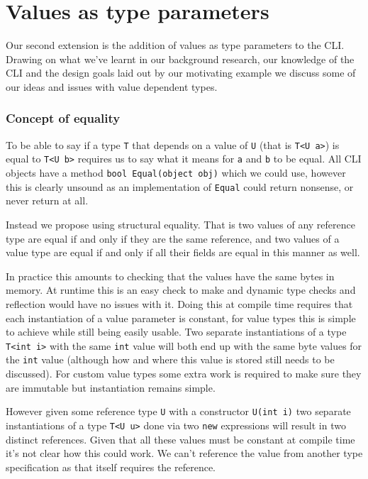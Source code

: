 \chapter{Values as type parameters}

Our second extension is the addition of values as type parameters to the CLI.
Drawing on what we've learnt in our background research, our knowledge of the 
CLI and the design goals laid out by our motivating example we discuss some of
our ideas and issues with value dependent types.

\subsection{Concept of equality}

To be able to say if a type \texttt{T} that depends on a value of
\texttt{U} (that is \texttt{T<U a>}) is equal to \texttt{T<U b>} requires
us to say what it means for \texttt{a} and \texttt{b} to be equal.
All CLI objects have a method \texttt{bool Equal(object obj)} which
we could use, however this is clearly unsound as an implementation
of \texttt{Equal} could return nonsense, or never return at all.

Instead we propose using structural equality. That is
two values of any reference type are equal if and only if they are
the same reference, and two values of a value type are equal if and
only if all their fields are equal in this manner as well. 

In practice this amounts to checking that the values have the same bytes in memory.
At runtime this is an easy check to make and dynamic type checks and reflection would have
no issues with it. Doing this at compile time requires that each instantiation of a value 
parameter is constant, for value types this is simple to achieve while still being easily usable.
Two separate instantiations of a type \texttt{T<int i>} with the same \texttt{int} value will both end 
up with the same byte values for the \texttt{int} value (although how and where this value is stored 
still needs to be discussed). For custom value types some extra work is required to make sure they are
immutable but instantiation remains simple. 

However given some reference type \texttt{U} with a constructor \texttt{U(int i)} two separate instantiations of 
a type \texttt{T<U u>} done via two \texttt{new} expressions will result in two distinct references. 
Given that all these values must be constant at compile time it's not clear how this could work. We can't 
reference the value from another type specification as that itself requires the reference.

